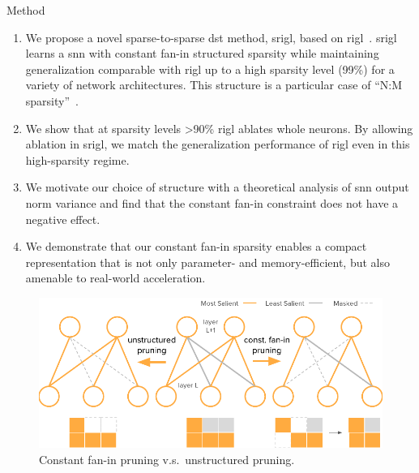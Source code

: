 \documentclass[final]{beamer}
\newlength{\colwidth}
\begin{document}
\begin{frame}[t]
\begin{columns}[t]
\begin{column}{\colwidth}
  \begin{block}{Method}
  \begin{enumerate}
        \item We propose a novel sparse-to-sparse \gls{dst} method, \gls{srigl}, based on \gls{rigl}~\citep{evci_rigging_2021}. \Gls{srigl} learns a \gls{snn} with constant fan-in structured sparsity while maintaining generalization comparable with \gls{rigl} up to a high sparsity level (99\%) for a variety of network architectures. This structure is a particular case of ``N:M sparsity''~\citep{NvidiaA100}.
        \item We show that at sparsity levels >90\% \gls{rigl} ablates whole neurons. By allowing ablation in \gls{srigl}, we match the generalization performance of \gls{rigl} even in this high-sparsity regime.
        \item We motivate our choice of structure with a theoretical analysis of \gls{snn} output norm variance and find that the constant fan-in constraint does not have a negative effect.
        \item We demonstrate that our constant fan-in sparsity enables a compact representation that is not only parameter- and memory-efficient, but also amenable to real-world acceleration.
    \end{enumerate}

    \begin{figure}
        \includegraphics[width=.85\colwidth]{srigl_example_figs/constantfanin.pdf}
        \caption{Constant fan-in pruning v.s.\ unstructured pruning.}\label{fig:constfanin}
    \end{figure}


\end{block}
\end{column}
\end{columns}
\end{frame}
\end{document}
